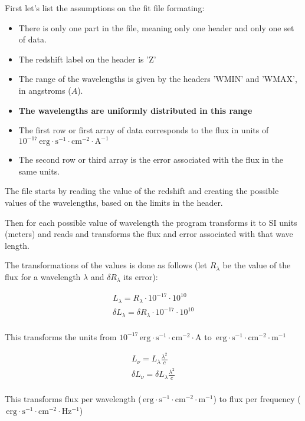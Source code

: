 \documentclass[11pt]{article}
\newcommand{\unit}[1]{\ensuremath{\, \mathrm{#1}}}
\begin{document}
First let's list the assumptions on the fit file formating:
\begin{itemize}
\item There is only one part in the file, meaning only one header and only one set of data.
\item The redshift label on the header is 'Z'
\item The range of the wavelengths is given by the headers 'WMIN' and 'WMAX', in angstroms ($A$).
\item {\bf The wavelengths are uniformly distributed in this range}
\item The first row or first array of data corresponds to the flux in units of $10^{-17}\unit{erg\cdot s^{-1}\cdot cm^{-2} \cdot A^{-1}}$
\item The second row or third array is the error associated with the flux in the same units.
\end{itemize}

The file starts by reading the value of the redshift and creating the possible values of the wavelengths, based on the limits in the header.

Then for each possible value of wavelength the program transforms it to SI units (meters) and reads and transforms the flux and error associated with that wave length.

The transformations of the values is done as follows (let $R_\lambda$ be the value of the flux for a wavelength $\lambda$ and $\delta R_\lambda$ its error):

\begin{align*}
L_\lambda = R_\lambda \cdot 10^{-17} \cdot 10^{10}\\
\delta L_\lambda = \delta R_\lambda \cdot 10^{-17} \cdot 10^{10}\\
\end{align*}

This transforms the units from $10^{-17}\unit{erg\cdot s^{-1}\cdot cm^{-2} \cdot A}$ to $\unit{erg\cdot s^{-1}\cdot cm^{-2} \cdot m^{-1}}$

\begin{align*}
L_\nu = L_\lambda \frac{\lambda^2}{c}\\
\delta L_\nu = \delta L_\lambda \frac{\lambda^2}{c}\\
\end{align*}

This transforms flux per wavelength ($\unit{erg\cdot s^{-1}\cdot cm^{-2} \cdot m^{-1}}$) to flux per frequency ($\unit{erg\cdot s^{-1}\cdot cm^{-2} \cdot Hz^{-1}}$)
\end{document}
